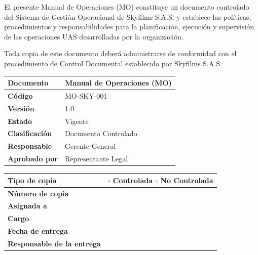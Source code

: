 

El presente Manual de Operaciones (MO) constituye un documento controlado del Sistema de Gestión Operacional de Skyfilms S.A.S. y establece las políticas, procedimientos y responsabilidades para la planificación, ejecución y supervisión de las operaciones UAS desarrolladas por la organización.

Toda copia de este documento deberá administrarse de conformidad con el procedimiento de Control Documental establecido por Skyfilms S.A.S.

\vspace{0.5cm}

\renewcommand{\arraystretch}{1.4}

\begin{table}[H]
\centering
\begin{tabularx}{\textwidth}{|L{5cm}|X|}
\hline
\textbf{Documento} & Manual de Operaciones (MO) \\ \hline
\textbf{Código} & MO-SKY-001 \\ \hline
\textbf{Versión} & 1.0 \\ \hline
\textbf{Estado} & Vigente \\ \hline
\textbf{Clasificación} & Documento Controlado \\ \hline
\textbf{Responsable} & Gerente General \\ \hline
\textbf{Aprobado por} & Representante Legal \\ \hline
\end{tabularx}
\end{table}

\vspace{0.4cm}

\renewcommand{\arraystretch}{1.4}

\begin{table}[H]
\centering
\begin{tabularx}{\textwidth}{|L{5cm}|X|}
\hline
\textbf{Tipo de copia} &
$\square$ Controlada \hspace{1cm}
$\square$ No Controlada \\ \hline

\textbf{Número de copia} & \\ \hline

\textbf{Asignada a} & \\ \hline

\textbf{Cargo} & \\ \hline

\textbf{Fecha de entrega} & \\ \hline

\textbf{Responsable de la entrega} & \\ \hline

\end{tabularx}
\end{table}

